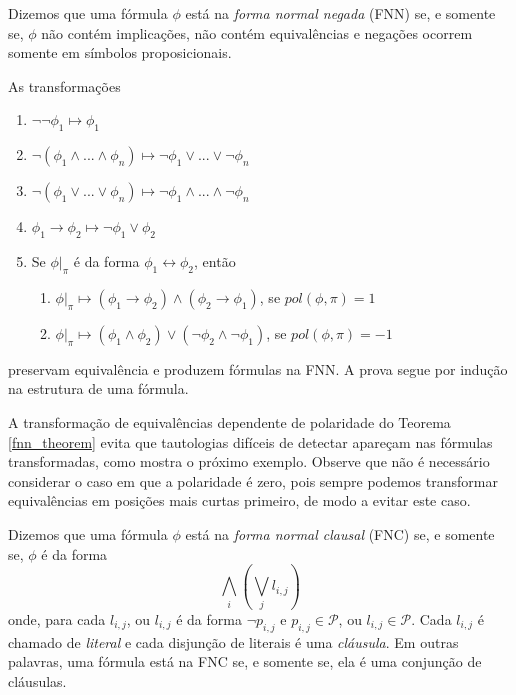 \begin{definition}
    Dizemos que uma fórmula $\phi$ está na \emph{forma normal negada} (FNN) se, e somente se, $\phi$ não contém implicações, não contém equivalências e negações ocorrem somente em símbolos proposicionais.
\end{definition}

\begin{theorem}
    \label{fnn_theorem}
    As transformações
    \begin{enumerate}
        \item $\neg \neg \phi_1 \longmapsto \phi_1$
        \item $\neg(\phi_1 \wedge ... \wedge \phi_n) \longmapsto \neg \phi_1 \vee ... \vee \neg \phi_n$
        \item $\neg(\phi_1 \vee ... \vee \phi_n) \longmapsto \neg \phi_1 \wedge ... \wedge \neg \phi_n$
        \item $\phi_1 \rightarrow \phi_2 \longmapsto \neg \phi_1 \vee \phi_2$
        \item Se $\phi|_\pi$ é da forma $\phi_1 \leftrightarrow \phi_2$, então
        \begin{enumerate}
        	\item $\phi|_\pi \longmapsto (\phi_1 \rightarrow \phi_2) \wedge (\phi_2 \rightarrow \phi_1)$, se $pol(\phi,\pi) = 1$
        	\item $\phi|_\pi \longmapsto (\phi_1 \wedge \phi_2) \vee (\neg \phi_2 \wedge \neg \phi_1)$, se $pol(\phi,\pi) = -1$
        \end{enumerate}
    \end{enumerate}
    preservam equivalência e produzem fórmulas na FNN. A prova segue por indução na estrutura de uma fórmula.
\end{theorem}

A transformação de equivalências dependente de polaridade do Teorema \ref{fnn_theorem} evita que tautologias difíceis de detectar apareçam nas fórmulas transformadas, como mostra o próximo exemplo. Observe que não é necessário considerar o caso em que a polaridade é zero, pois sempre podemos transformar equivalências em posições mais curtas primeiro, de modo a evitar este caso.

\begin{definition}
    Dizemos que uma fórmula $\phi$ está na \emph{forma normal clausal} (FNC) se, e somente se, $\phi$ é da forma $$\bigwedge_i \left( \bigvee_j l_{i,j} \right)$$ onde, para cada $l_{i,j}$, ou $l_{i,j}$ é da forma $\neg p_{i,j}$ e $p_{i,j} \in \mathcal{P}$, ou $l_{i,j} \in \mathcal{P}$. Cada $l_{i,j}$ é chamado de \emph{literal} e cada disjunção de literais é uma \emph{cláusula}. Em outras palavras, uma fórmula está na FNC se, e somente se, ela é uma conjunção de cláusulas.
\end{definition}

